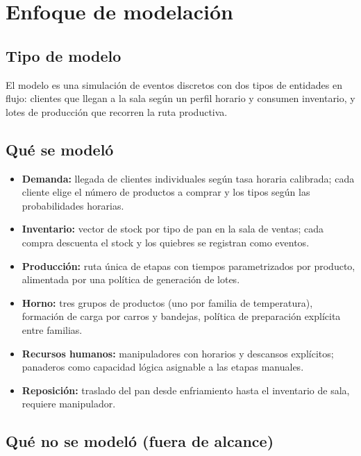 \documentclass[12pt]{article}
\begin{document}
\newpage
\section{Enfoque de modelación}

\subsection{Tipo de modelo}

El modelo es una simulación de eventos discretos con dos tipos de entidades en flujo: clientes que llegan a la sala según un perfil horario y consumen inventario, y lotes de producción que recorren la ruta productiva.

\subsection{Qué se modeló}

\begin{itemize}
  \item \textbf{Demanda:} llegada de clientes individuales según tasa horaria calibrada; cada cliente elige el número de productos a comprar y los tipos según las probabilidades horarias.
  \item \textbf{Inventario:} vector de stock por tipo de pan en la sala de ventas; cada compra descuenta el stock y los quiebres se registran como eventos.
  \item \textbf{Producción:} ruta única de etapas con tiempos parametrizados por producto, alimentada por una política de generación de lotes.
  \item \textbf{Horno:} tres grupos de productos (uno por familia de temperatura), formación de carga por carros y bandejas, política de preparación explícita entre familias.
  \item \textbf{Recursos humanos:} manipuladores con horarios y descansos explícitos; panaderos como capacidad lógica asignable a las etapas manuales.
  \item \textbf{Reposición:} traslado del pan desde enfriamiento hasta el inventario de sala, requiere manipulador.
\end{itemize}

\subsection{Qué no se modeló (fuera de alcance)}
\end{document}
